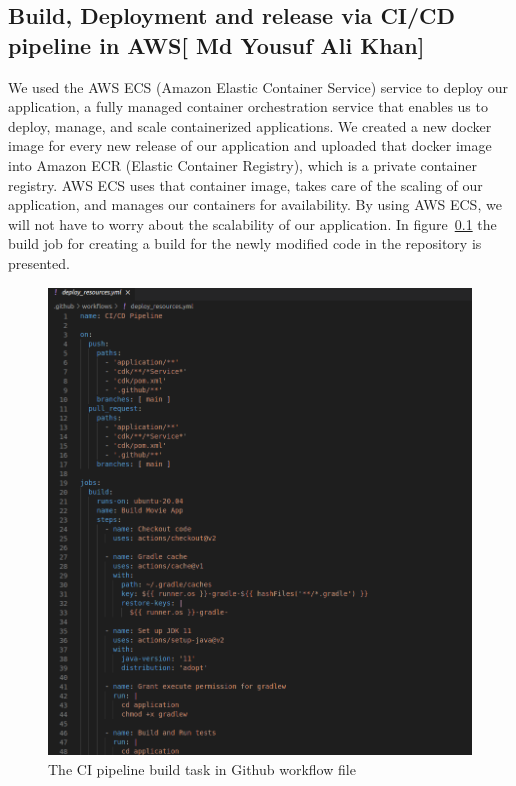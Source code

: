 \subsection{Build, Deployment and release via CI/CD pipeline in AWS[ Md Yousuf Ali Khan]}\label{sec:build-task-aws}
We used the AWS ECS (Amazon Elastic Container Service) service to deploy our application, a fully managed container orchestration service that enables us to deploy, manage, and scale containerized applications. We created a new docker image for every new release of our application and uploaded that docker image into Amazon ECR (Elastic Container Registry), which is a private container registry. AWS ECS uses that container image, takes care of the scaling of our application, and manages our containers for availability. By using AWS ECS, we will not have to worry about the scalability of our application. In figure~\ref{sec:build-task-aws} the build job for creating a build for the newly modified code in the repository is presented.

\begin{figure}[h]
\includegraphics[scale=0.40]{images/yousuf/build-job-aws-github.png}
\centering
\caption{The {{CI\CD}} pipeline build task in Github workflow file}
\label{fig:ci-cd-build-task}
\end{figure}




